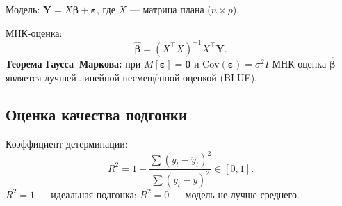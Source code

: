 Модель: $\mathbf{Y} = X\boldsymbol{\beta} + \boldsymbol{\varepsilon}$, где $X$ — матрица плана ($n \times p$).

МНК-оценка:
\[
  \hat{\boldsymbol{\beta}} = (X^\top X)^{-1} X^\top \mathbf{Y}.
\]
\textbf{Теорема Гаусса–Маркова:} при $M[\boldsymbol{\varepsilon}]=\mathbf{0}$ и $\mathrm{Cov}(\boldsymbol{\varepsilon})=\sigma^2 I$ МНК-оценка $\hat{\boldsymbol{\beta}}$ является лучшей линейной несмещённой оценкой (BLUE).

\subsection*{Оценка качества подгонки}

Коэффициент детерминации:
\[
  R^2 = 1 - \frac{\sum(y_t - \hat{y}_t)^2}{\sum(y_t - \bar{y})^2} \in [0,1].
\]
$R^2 = 1$ — идеальная подгонка; $R^2 = 0$ — модель не лучше среднего.

\clearpage
